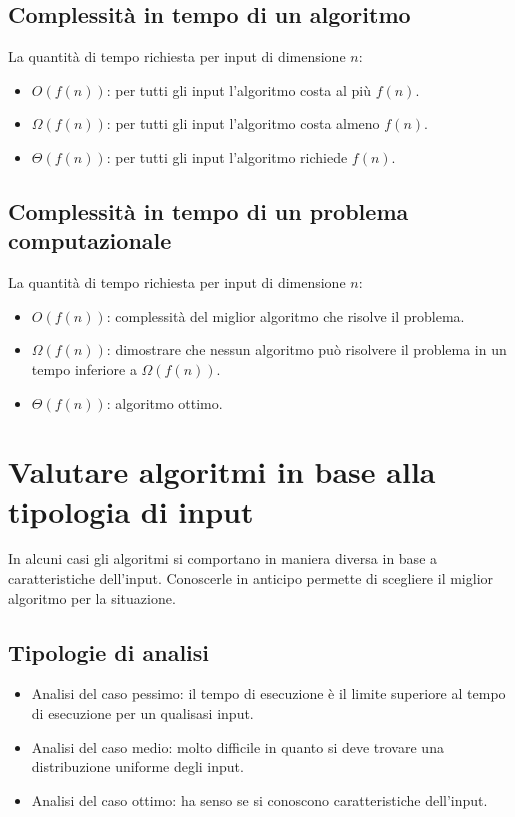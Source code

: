 \subsection{Complessit\`a in tempo di un algoritmo}
La quantit\`a di tempo richiesta per input di dimensione $n$:
\begin{itemize}
\item $O(f(n))$: per tutti gli input l'algoritmo costa al pi\`u $f(n)$.
\item $\Omega(f(n))$: per tutti gli input l'algoritmo costa almeno $f(n)$.
\item $\Theta(f(n))$: per tutti gli input l'algoritmo richiede $f(n)$.
\end{itemize}
\subsection{Complessit\`a in tempo di un problema computazionale}
La quantit\`a di tempo richiesta per input di dimensione $n$:
\begin{itemize}
\item $O(f(n))$: complessit\`a del miglior algoritmo che risolve il problema.
\item $\Omega(f(n))$: dimostrare che nessun algoritmo pu\`o risolvere il problema in un tempo inferiore a $\Omega(f(n))$.
\item $\Theta(f(n))$: algoritmo ottimo.
\end{itemize}
\section{Valutare algoritmi in base alla tipologia di input}
In alcuni casi gli algoritmi si comportano in maniera diversa in base a caratteristiche dell'input. Conoscerle in anticipo permette di scegliere il miglior
algoritmo per la situazione. 
\subsection{Tipologie di analisi}
\begin{itemize}
\item Analisi del caso pessimo: il tempo di esecuzione \`e il limite superiore al tempo di esecuzione per un qualisasi input. 
\item Analisi del caso medio: molto difficile in quanto si deve trovare una distribuzione uniforme degli input.
\item Analisi del caso ottimo: ha senso se si conoscono caratteristiche dell'input.
\end{itemize}
